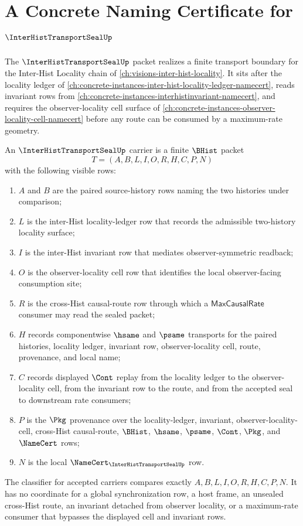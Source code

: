 \chapter{A Concrete Naming Certificate for $\InterHistTransportSealUp$}
\label{ch:concrete-instances-inter-hist-transport-seal-namecert}

The $\InterHistTransportSealUp$ packet realizes a finite transport boundary for the Inter-Hist Locality chain of \autoref{ch:visions-inter-hist-locality}. It sits after the locality ledger of \autoref{ch:concrete-instances-inter-hist-locality-ledger-namecert}, reads invariant rows from \autoref{ch:concrete-instances-interhistinvariant-namecert}, and requires the observer-locality cell surface of \autoref{ch:concrete-instances-observer-locality-cell-namecert} before any route can be consumed by a maximum-rate geometry.

\begin{definition}
\label{def:inter-hist-transport-seal-carrier}
An $\InterHistTransportSealUp$ carrier is a finite $\BHist$ packet
$$
T=(A,B,L,I,O,R,H,C,P,N)
$$
with the following visible rows:
\begin{enumerate}
\item $A$ and $B$ are the paired source-history rows naming the two histories under comparison;
\item $L$ is the inter-Hist locality-ledger row that records the admissible two-history locality surface;
\item $I$ is the inter-Hist invariant row that mediates observer-symmetric readback;
\item $O$ is the observer-locality cell row that identifies the local observer-facing consumption site;
\item $R$ is the cross-Hist causal-route row through which a $\mathsf{MaxCausalRate}$ consumer may read the sealed packet;
\item $H$ records componentwise $\hsame$ and $\psame$ transports for the paired histories, locality ledger, invariant row, observer-locality cell, route, provenance, and local name;
\item $C$ records displayed $\Cont$ replay from the locality ledger to the observer-locality cell, from the invariant row to the route, and from the accepted seal to downstream rate consumers;
\item $P$ is the $\Pkg$ provenance over the locality-ledger, invariant, observer-locality-cell, cross-Hist causal-route, $\BHist$, $\hsame$, $\psame$, $\Cont$, $\Pkg$, and $\NameCert$ rows;
\item $N$ is the local $\NameCert_{\InterHistTransportSealUp}$ row.
\end{enumerate}
The classifier for accepted carriers compares exactly $A,B,L,I,O,R,H,C,P,N$. It has no coordinate for a global synchronization row, a host frame, an unsealed cross-Hist route, an invariant detached from observer locality, or a maximum-rate consumer that bypasses the displayed cell and invariant rows.
\end{definition}

